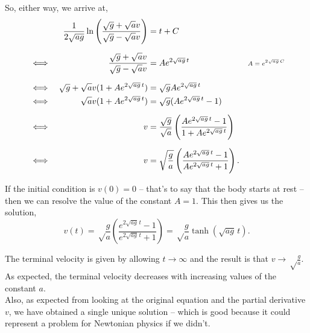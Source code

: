 \documentclass[../MathsNotesBase.tex]{subfiles}
\begin{document}
{\begin{exe}
{			So, either way, we arrive at,
			\begin{align*}
				&& \frac{1}{2\sqrt{ag}} \ln\left(\frac{\sqrt{g} + \sqrt{a}v}{\sqrt{g} - \sqrt{a}v}\right) &= t + C \nn
				&\iff & \frac{\sqrt{g} + \sqrt{a}v}{\sqrt{g} - \sqrt{a}v} &= Ae^{2\sqrt{ag}\,t} &\sidecomment{${ A = e^{2\sqrt{ag}\,C} }$} \nn
				&\iff & \sqrt{g} + \sqrt{a} v (1 + Ae^{2\sqrt{ag}\,t}) &= \sqrt{g} Ae^{2\sqrt{ag}\,t} \\
				&\iff & \sqrt{a} v (1 + Ae^{2\sqrt{ag}\,t}) &= \sqrt{g} ( Ae^{2\sqrt{ag}\,t} - 1) \nn
				&\iff & v &= \frac{\sqrt{g}}{\sqrt{a}} \left( \frac{Ae^{2\sqrt{ag}\,t} - 1}{1 + Ae^{2\sqrt{ag}\,t}} \right) \nn
				&\iff & v &= \sqrt\frac{g}{a} \left( \frac{Ae^{2\sqrt{ag}\,t} - 1}{Ae^{2\sqrt{ag}\,t} + 1} \right). \\
			\end{align*}
			
			If the initial condition is ${ v(0) = 0 }$ -- that's to say that the body starts at rest -- then we can resolve the value of the constant ${ A = 1 }$. This then gives us the solution,
			\[ v(t) = \sqrt\frac{g}{a} \left( \frac{e^{2\sqrt{ag}\,t} - 1}{e^{2\sqrt{ag}\,t} + 1} \right) = \sqrt\frac{g}{a} \tanh(\sqrt{ag}\,t). \]
			
			The terminal velocity is given by allowing ${ t \to \infty }$ and the result is that ${ v \to \sqrt\frac{g}{a} }$. As expected, the terminal velocity decreases with increasing values of the constant $a$.\\
			
			Also, as expected from looking at the original equation and the partial derivative \wrt $v$, we have obtained a single unique solution -- which is good because it could represent a problem for Newtonian physics if we didn't.
			}
		\end{exe}
	}


\end{document}
